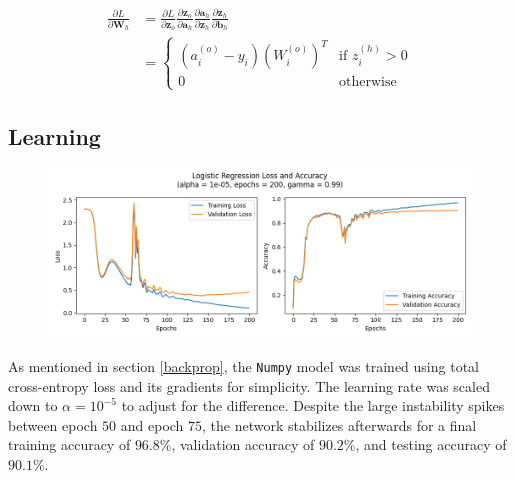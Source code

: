 \documentclass[letter]{article}
\begin{document}
\begin{align*}
\frac{\partial{L}}{\partial{\textbf{W}_h}} &= \frac{\partial{L}}{\partial{\textbf{z}_o}} \frac{\partial{\textbf{z}_o}}{\partial{\textbf{a}_h}} \frac{\partial{\textbf{a}_h}}{\partial{\textbf{z}_h}}
\frac{\partial{\textbf{z}_h}}{\partial{\textbf{b}_h}} \\
&= 
\begin{cases}
	\left( a_i^{(o)} - y_i \right) \left(W_i^{(o)}\right)^T & \text{if } z_i^{(h)} > 0 \\
	0 & \text{otherwise}
\end{cases}
\end{align*}

\newpage

\subsection{Learning}

\begin{figure}[H]
	\centering
	\includegraphics[width=\linewidth]{Figure_1}
	\label{fig:plot1}
\end{figure}

As mentioned in section \ref{backprop}, the \texttt{Numpy} model was trained using total cross-entropy loss and its gradients for simplicity. The learning rate was scaled down to $\alpha = 10^{-5}$ to adjust for the difference. Despite the large instability spikes between epoch $50$ and epoch $75$, the network stabilizes afterwards for a final training accuracy of $96.8\%$, validation accuracy of $90.2\%$, and testing accuracy of $90.1\%$. 
\end{document}

